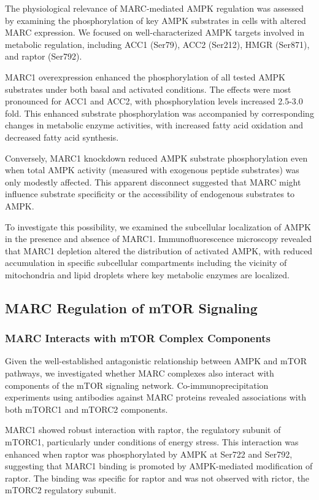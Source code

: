 \documentclass[11pt,a4paper]{article}
\begin{document}
The physiological relevance of MARC-mediated AMPK regulation was assessed by examining the phosphorylation of key AMPK substrates in cells with altered MARC expression. We focused on well-characterized AMPK targets involved in metabolic regulation, including ACC1 (Ser79), ACC2 (Ser212), HMGR (Ser871), and raptor (Ser792).

MARC1 overexpression enhanced the phosphorylation of all tested AMPK substrates under both basal and activated conditions. The effects were most pronounced for ACC1 and ACC2, with phosphorylation levels increased 2.5-3.0 fold. This enhanced substrate phosphorylation was accompanied by corresponding changes in metabolic enzyme activities, with increased fatty acid oxidation and decreased fatty acid synthesis.

Conversely, MARC1 knockdown reduced AMPK substrate phosphorylation even when total AMPK activity (measured with exogenous peptide substrates) was only modestly affected. This apparent disconnect suggested that MARC might influence substrate specificity or the accessibility of endogenous substrates to AMPK.

To investigate this possibility, we examined the subcellular localization of AMPK in the presence and absence of MARC1. Immunofluorescence microscopy revealed that MARC1 depletion altered the distribution of activated AMPK, with reduced accumulation in specific subcellular compartments including the vicinity of mitochondria and lipid droplets where key metabolic enzymes are localized.

\subsection{MARC Regulation of mTOR Signaling}

\subsubsection{MARC Interacts with mTOR Complex Components}

Given the well-established antagonistic relationship between AMPK and mTOR pathways, we investigated whether MARC complexes also interact with components of the mTOR signaling network. Co-immunoprecipitation experiments using antibodies against MARC proteins revealed associations with both mTORC1 and mTORC2 components.

MARC1 showed robust interaction with raptor, the regulatory subunit of mTORC1, particularly under conditions of energy stress. This interaction was enhanced when raptor was phosphorylated by AMPK at Ser722 and Ser792, suggesting that MARC1 binding is promoted by AMPK-mediated modification of raptor. The binding was specific for raptor and was not observed with rictor, the mTORC2 regulatory subunit.
\end{document}
